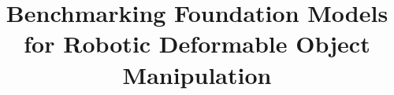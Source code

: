 \documentclass{article} %
\title{\centering Benchmarking Foundation Models\\for Robotic Deformable Object Manipulation}
\theoremstyle{definition}
\begin{document}
\maketitle






\appendix
\begin{appendices} %

\end{appendices}
\end{document}
